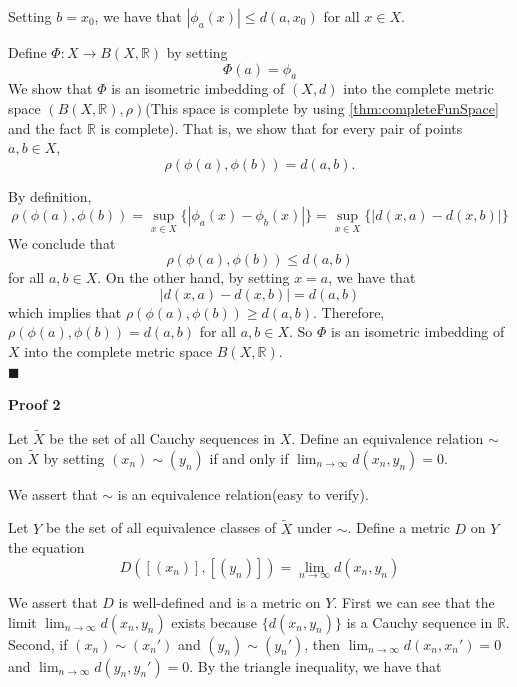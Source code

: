 \documentclass[main.tex]{subfiles}
\begin{document}
Setting $b = x_0$, we have that $|\phi_a(x)|\le d(a, x_0)$ for all $x \in X$.  
\par Define $\Phi: X \rightarrow B(X, \mathbb{R})$ by setting 
\begin{equation}
    \Phi(a) = \phi_a
\end{equation}
We show that $\Phi$ is an isometric imbedding of $(X, d)$ into the complete metric space $(B(X, \mathbb{R}), \rho)$(This space is complete by using \ref{thm:completeFunSpace} and the fact $\mathbb{R}$ is complete). That is, we show that for every pair of points $a, b \in X$, 
\begin{equation}
    \rho(\phi(a), \phi(b)) = d(a, b). 
\end{equation}
\par By definition, 
\begin{equation}
    \rho(\phi(a), \phi(b)) = \sup_{x \in X} \{|\phi_a(x) - \phi_b(x)|\} = \sup_{x \in X} \{|d(x, a) - d(x, b)|\}
\end{equation}
We conclude that 
\begin{equation}
    \rho(\phi(a), \phi(b)) \leq d(a, b)
\end{equation}
for all $a, b \in X$. On the other hand, by setting $x = a$, we have that 
\begin{equation}
    |d(x, a) - d(x, b)| = d(a, b)
\end{equation}
which implies that $\rho(\phi(a), \phi(b)) \geq d(a, b)$. Therefore, $\rho(\phi(a), \phi(b)) = d(a, b)$ for all $a, b \in X$. So $\Phi$ is an isometric imbedding of $X$ into the complete metric space $B(X, \mathbb{R})$. 
\mbox{} \\ \null \hfill $\blacksquare$ 
\par \noindent \textbf{Proof 2} 
\par Let $\tilde{X}$ be the set of all Cauchy sequences in $X$. Define an equivalence relation $\sim$ on $\tilde{X}$ by setting $(x_n) \sim (y_n)$ if and only if $\lim_{n \to \infty} d(x_n, y_n) = 0$. 
\par We assert that $\sim$ is an equivalence relation(easy to verify). 
\par Let $Y$ be the set of all equivalence classes of $\tilde{X}$ under $\sim$. Define a metric $D$ on $Y$ the equation 
\begin{equation}
    D([(x_n)], [(y_n)]) = \lim_{n \to \infty} d(x_n, y_n)
\end{equation}  
\par We assert that $D$ is well-defined and is a metric on $Y$. First we can see that the limit $\lim_{n \to \infty} d(x_n, y_n)$ exists because $\{d(x_n, y_n)\}$ is a Cauchy sequence in $\mathbb{R}$. Second, if $(x_n) \sim (x_n')$ and $(y_n) \sim (y_n')$, then $\lim_{n \to \infty} d(x_n, x_n') = 0$ and $\lim_{n \to \infty} d(y_n, y_n') = 0$. By the triangle inequality, we have that 
\end{document}
